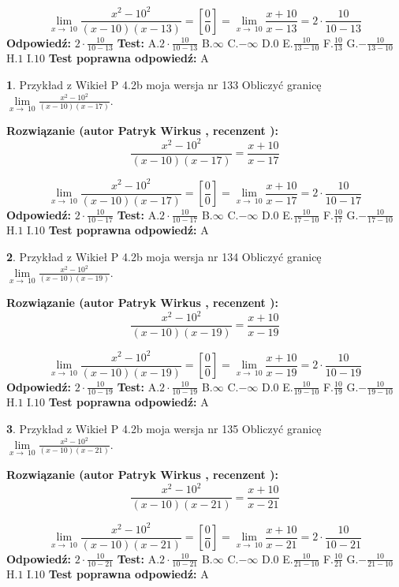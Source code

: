 \documentclass[12pt, a4paper]{article}
\theoremstyle{definition} %
\newtheorem{zad}{}
\newcommand{\zadStart}[1]{\begin{zad}#1\newline}
\newcommand{\zadStop}{\end{zad}}
\newcommand{\rozwStart}[2]{\noindent \textbf{Rozwiązanie (autor #1 , recenzent #2): }\newline}
\newcommand{\rozwStop}{\newline}
\newcommand{\odpStart}{\noindent \textbf{Odpowiedź:}\newline}
\newcommand{\odpStop}{\newline}
\newcommand{\testStart}{\noindent \textbf{Test:}\newline}
\newcommand{\testStop}{\newline}
\newcommand{\kluczStart}{\noindent \textbf{Test poprawna odpowiedź:}\newline}
\newcommand{\kluczStop}{\newline}
\begin{document}
$$\lim\limits_{x\to\ 10}\frac{x^{2}-10^{2}}{(x-10)(x-13)}=[\frac{0}{0}]=\lim\limits_{x\to\ 10}\frac{x+10}{x-13}=2 \cdot \frac{10}{10-13}$$
\rozwStop
\odpStart
$2 \cdot \frac{10}{10-13}$
\odpStop
\testStart
A.$2 \cdot \frac{10}{10-13}$
B.$\infty$
C.$-\infty$
D.$0$
E.$\frac{10}{13-10}$
F.$\frac{10}{13}$
G.$-\frac{10}{13-10}$
H.$1$
I.$10$
\testStop
\kluczStart
A
\kluczStop



\zadStart{Przykład z Wikieł P 4.2b moja wersja nr 133}
Obliczyć granicę $\lim\limits_{x\to\ 10}\frac{x^{2}-10^{2}}{(x-10)(x-17)}$.
\zadStop
\rozwStart{Patryk Wirkus}{}
$$\frac{x^{2}-10^{2}}{(x-10)(x-17)}=\frac{x+10}{x-17}$$

$$\lim\limits_{x\to\ 10}\frac{x^{2}-10^{2}}{(x-10)(x-17)}=[\frac{0}{0}]=\lim\limits_{x\to\ 10}\frac{x+10}{x-17}=2 \cdot \frac{10}{10-17}$$
\rozwStop
\odpStart
$2 \cdot \frac{10}{10-17}$
\odpStop
\testStart
A.$2 \cdot \frac{10}{10-17}$
B.$\infty$
C.$-\infty$
D.$0$
E.$\frac{10}{17-10}$
F.$\frac{10}{17}$
G.$-\frac{10}{17-10}$
H.$1$
I.$10$
\testStop
\kluczStart
A
\kluczStop



\zadStart{Przykład z Wikieł P 4.2b moja wersja nr 134}
Obliczyć granicę $\lim\limits_{x\to\ 10}\frac{x^{2}-10^{2}}{(x-10)(x-19)}$.
\zadStop
\rozwStart{Patryk Wirkus}{}
$$\frac{x^{2}-10^{2}}{(x-10)(x-19)}=\frac{x+10}{x-19}$$

$$\lim\limits_{x\to\ 10}\frac{x^{2}-10^{2}}{(x-10)(x-19)}=[\frac{0}{0}]=\lim\limits_{x\to\ 10}\frac{x+10}{x-19}=2 \cdot \frac{10}{10-19}$$
\rozwStop
\odpStart
$2 \cdot \frac{10}{10-19}$
\odpStop
\testStart
A.$2 \cdot \frac{10}{10-19}$
B.$\infty$
C.$-\infty$
D.$0$
E.$\frac{10}{19-10}$
F.$\frac{10}{19}$
G.$-\frac{10}{19-10}$
H.$1$
I.$10$
\testStop
\kluczStart
A
\kluczStop



\zadStart{Przykład z Wikieł P 4.2b moja wersja nr 135}
Obliczyć granicę $\lim\limits_{x\to\ 10}\frac{x^{2}-10^{2}}{(x-10)(x-21)}$.
\zadStop
\rozwStart{Patryk Wirkus}{}
$$\frac{x^{2}-10^{2}}{(x-10)(x-21)}=\frac{x+10}{x-21}$$

$$\lim\limits_{x\to\ 10}\frac{x^{2}-10^{2}}{(x-10)(x-21)}=[\frac{0}{0}]=\lim\limits_{x\to\ 10}\frac{x+10}{x-21}=2 \cdot \frac{10}{10-21}$$
\rozwStop
\odpStart
$2 \cdot \frac{10}{10-21}$
\odpStop
\testStart
A.$2 \cdot \frac{10}{10-21}$
B.$\infty$
C.$-\infty$
D.$0$
E.$\frac{10}{21-10}$
F.$\frac{10}{21}$
G.$-\frac{10}{21-10}$
H.$1$
I.$10$
\testStop
\kluczStart
A
\kluczStop
\end{document}
